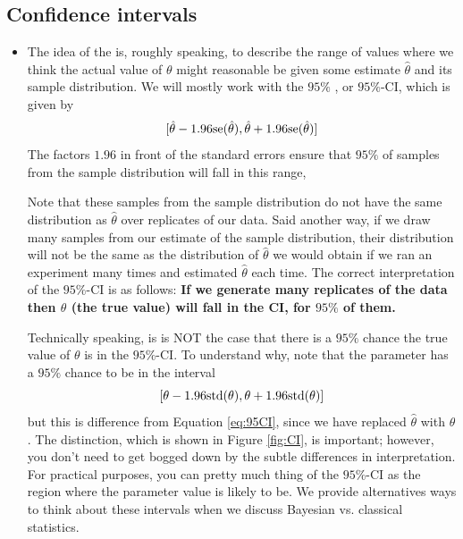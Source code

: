 \subsection{Confidence intervals}

\begin{itemize}

\item The idea of the  is, roughly speaking, to describe the range of values where we think the actual value of $\theta$ might reasonable be given some estimate $\hat{\theta}$ and its sample distribution. We will mostly work with the $95\%$ , or $95\%$-CI, which is given by 
\begin{equation}\label{eq:95CI}
[\hat{\theta} - 1.96{\rm se}(\hat{\theta}), \hat{\theta} + 1.96{\rm se}(\hat{\theta})]
\end{equation}
The factors $1.96$ in front of the standard errors ensure that $95\%$ of samples from the sample distribution will fall in this range, 



Note that these samples from the sample distribution do not have the same distribution as $\hat{\theta}$ over replicates of our data. Said another way, if we draw many samples from our estimate of the sample distribution, their distribution will not be the same as the distribution of $\hat{\theta}$ we would obtain if we ran an experiment many times and estimated $\hat{\theta}$ each time. The correct interpretation of the $95\%$-CI is as follows: {\bf If we generate many replicates of the data then $\theta$ (the true value) will fall in the CI, for $95\%$ of them.} 

Technically speaking, is is NOT the case that there is a $95\%$ chance the true value of $\theta$ is in the $95\%$-CI. 
To understand why, note that the parameter has a $95\%$ chance to be in the interval 
\begin{equation}\label{eq:95CIB}
[\theta - 1.96{\rm std}(\theta),\theta + 1.96{\rm std}(\theta)]
\end{equation}
but this is difference from Equation \ref{eq:95CI}, since we have replaced $\hat{\theta}$ with $\theta$. The distinction, which is shown in Figure \ref{fig:CI}, is important; however, you don't need to get bogged down by the subtle differences in interpretation. For practical purposes, you can pretty much thing of the $95\%$-CI as the region where the parameter value is likely to be. We provide alternatives ways to think about these intervals when we discuss Bayesian vs. classical statistics. 



\end{itemize}
